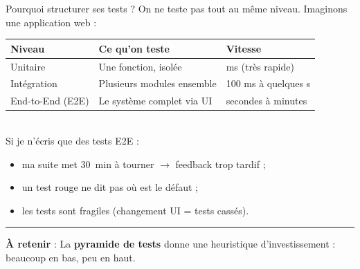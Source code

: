 \documentclass[aspectratio=169,11pt]{beamer}
\newcommand{\takeaway}[1]{%
\vfill\begin{beamercolorbox}[wd=\linewidth,sep=0.4em]{}
\color{accent2}\rule[0.6ex]{1.2em}{1.2pt}\hspace{0.4em}%
\textbf{\color{accent2}\small À retenir} \textcolor{textsoft}{:} %
{\small\color{textmain}#1}
\end{beamercolorbox}}
\begin{document}
\begin{frame}[t]{Pourquoi structurer ses tests ?}
\footnotesize
On ne teste pas tout au même niveau. Imaginons une application web :\\[0.4em]
\begin{tabular}{@{}p{3.8cm} p{4.4cm} p{3.8cm}@{}}
\toprule
\textbf{\color{accent}Niveau} & \textbf{\color{accent}Ce qu'on teste} & \textbf{\color{accent}Vitesse} \\
\midrule
Unitaire & Une fonction, isolée & ms (très rapide) \\
Intégration & Plusieurs modules ensemble & 100 ms à quelques s \\
End-to-End (E2E) & Le système complet via UI & secondes à minutes \\
\bottomrule
\end{tabular}
\vspace{0.4cm}
\\
Si je n'écris que des tests E2E :
\begin{itemize}\scriptsize
\item ma suite met 30~min à tourner $\to$ feedback trop tardif ;
\item un test rouge ne dit pas où est le défaut ;
\item les tests sont fragiles (changement UI = tests cassés).
\end{itemize}
\takeaway{La \textbf{pyramide de tests} donne une heuristique d'investissement : beaucoup en bas, peu en haut.}
\end{frame}
\end{document}
